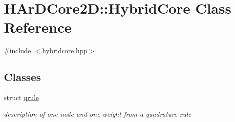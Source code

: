 \hypertarget{classHArDCore2D_1_1HybridCore}{}\section{H\+Ar\+D\+Core2D\+:\+:Hybrid\+Core Class Reference}
\label{classHArDCore2D_1_1HybridCore}


{\ttfamily \#include $<$hybridcore.\+hpp$>$}

\subsection*{Classes}
\begin{DoxyCompactItemize}
\item 
struct \hyperlink{structHArDCore2D_1_1HybridCore_1_1qrule}{qrule}
\begin{DoxyCompactList}\small\item\em description of one node and one weight from a quadrature rule \end{DoxyCompactList}\end{DoxyCompactItemize}
